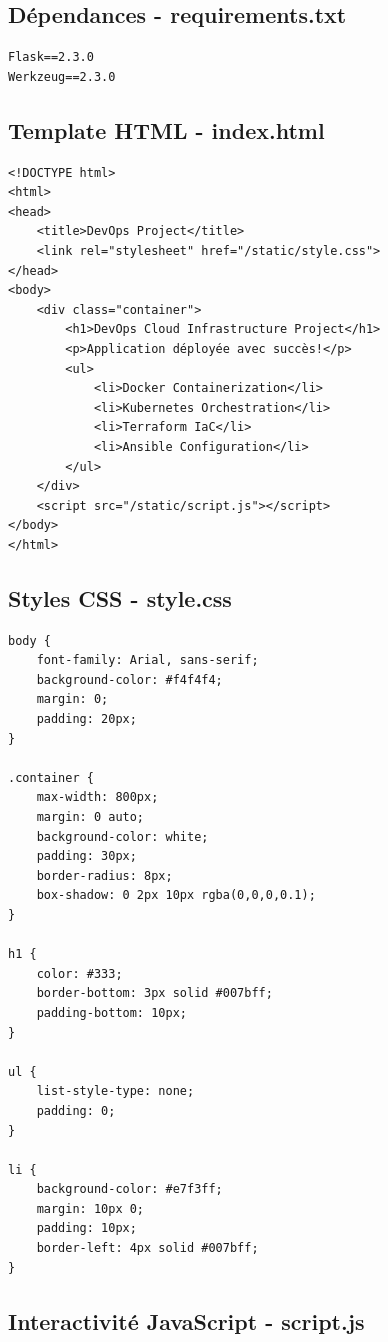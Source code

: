 \documentclass[12pt,a4paper]{report}
\begin{document}
\subsection{Dépendances - requirements.txt}

\begin{lstlisting}
Flask==2.3.0
Werkzeug==2.3.0
\end{lstlisting}

\subsection{Template HTML - index.html}

\begin{lstlisting}
<!DOCTYPE html>
<html>
<head>
    <title>DevOps Project</title>
    <link rel="stylesheet" href="/static/style.css">
</head>
<body>
    <div class="container">
        <h1>DevOps Cloud Infrastructure Project</h1>
        <p>Application déployée avec succès!</p>
        <ul>
            <li>Docker Containerization</li>
            <li>Kubernetes Orchestration</li>
            <li>Terraform IaC</li>
            <li>Ansible Configuration</li>
        </ul>
    </div>
    <script src="/static/script.js"></script>
</body>
</html>
\end{lstlisting}

\subsection{Styles CSS - style.css}

\begin{lstlisting}
body {
    font-family: Arial, sans-serif;
    background-color: #f4f4f4;
    margin: 0;
    padding: 20px;
}

.container {
    max-width: 800px;
    margin: 0 auto;
    background-color: white;
    padding: 30px;
    border-radius: 8px;
    box-shadow: 0 2px 10px rgba(0,0,0,0.1);
}

h1 {
    color: #333;
    border-bottom: 3px solid #007bff;
    padding-bottom: 10px;
}

ul {
    list-style-type: none;
    padding: 0;
}

li {
    background-color: #e7f3ff;
    margin: 10px 0;
    padding: 10px;
    border-left: 4px solid #007bff;
}
\end{lstlisting}

\subsection{Interactivité JavaScript - script.js}
\end{document}
